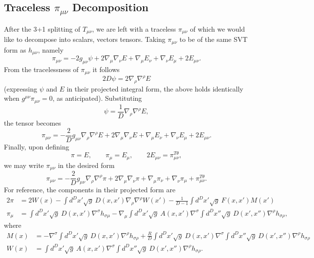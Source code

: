 \documentclass[10pt,letterpaper]{article}
\begin{document}
\subsection*{Traceless $\pi_{\mu\nu}$ Decomposition}
After the 3+1 splitting of $T_{\mu\nu}$, we are left with a traceless $\pi_{\mu\nu}$ of which we would like to decompose into scalars, vectors tensors. Taking $\pi_{\mu\nu}$ to be of the same SVT form as $h_{\mu\nu}$, namely
\begin{equation}
\pi_{\mu\nu} = -2 g_{\mu\nu}\psi + 2\nabla_\mu \nabla_\nu E + \nabla_\mu E_\nu +\nabla_\nu E_\mu + 2E_{\mu\nu}.
\end{equation}
From the tracelessness of $\pi_{\mu\nu}$ it follows
\begin{equation}
2D\psi = 2 \nabla_\rho \nabla^\rho E
\end{equation}
(expressing $\psi$ and $E$ in their projected integral form, the above holds identically when $g^{\mu\nu}\pi_{\mu\nu}=0$, as anticipated). 
Substituting
\begin{equation}
\psi = \frac{1}{D} \nabla_\rho \nabla^\rho E, 
\end{equation}
the tensor becomes
\begin{equation}
\pi_{\mu\nu} = -\frac{2}{D}g_{\mu\nu}\nabla_\rho \nabla^\rho E + 2\nabla_\mu \nabla_\nu E + \nabla_\mu E_\nu +\nabla_\nu E_\mu + 2E_{\mu\nu}.
\end{equation}
Finally, upon defining
\begin{equation}
\pi = E,\qquad \pi_\mu = E_\mu,\qquad 2E_{\mu\nu}=\pi_{\mu\nu}^{T\theta},
\end{equation}
we may write $\pi_{\mu\nu}$ in the desired form
\begin{equation}
\pi_{\mu\nu} = -\frac{2}{D}g_{\mu\nu}\nabla_\rho \nabla^\rho \pi + 2\nabla_\mu \nabla_\nu \pi + \nabla_\mu \pi_\nu +\nabla_\nu \pi_\mu + \pi^{T\theta}_{\mu\nu}.
\end{equation}
For reference, the components in their projected form are
\begin{align}
2\pi &= 2W(x)- \int d^Dx' \sqrt{g}\ D(x,x')\nabla_\rho \nabla^\rho W(x') - \frac{1}{D-1} \int  d^Dx' \sqrt{g}\ F(x,x') M(x')
\nonumber\\
\pi_{\mu}&=  \int d^Dx' \sqrt{g}\ D(x,x')\nabla^\sigma h_{\sigma\mu} - \nabla_\mu \int d^Dx' \sqrt{g}\ A(x,x')
\nabla^\sigma \int d^Dx'' \sqrt{g}\ D(x',x'') \nabla^\rho h_{\sigma\rho},
\end{align}
where
\begin{align}
M(x) &= - \nabla^\sigma \int d^Dx' \sqrt{g}\ D(x,x') \nabla^\rho h_{\sigma\rho}
 +\frac{R}{D}\int d^Dx' \sqrt g\ D(x,x') \nabla^\sigma \int d^Dx'' \sqrt{g}\ D(x',x'') \nabla^\rho h_{\sigma\rho}
\nonumber\\
W(x) &=  \int d^Dx' \sqrt{g}\ A(x,x') \nabla^\sigma  \int   d^Dx'' \sqrt{g}\ D(x',x'') \nabla^\rho h_{\sigma\rho}.
\end{align}
\end{document}
